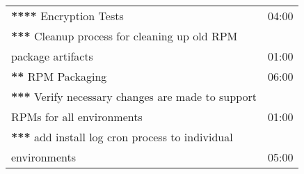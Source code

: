 \begin{tabular}{|l|l|}
 \textbf{****} Encryption Tests                             &     04:00  \\
 \textbf{***} Cleanup process for cleaning up old RPM       &            \\
 package artifacts                                 &     01:00  \\
\hline
 \textbf{**} RPM Packaging                                  &     06:00  \\
 \textbf{***} Verify necessary changes are made to support  &            \\
 RPMs for all environments                         &     01:00  \\
 \textbf{***} add install log cron process to individual    &            \\
 environments                                      &     05:00  \\
 \hline
\end{tabular}
